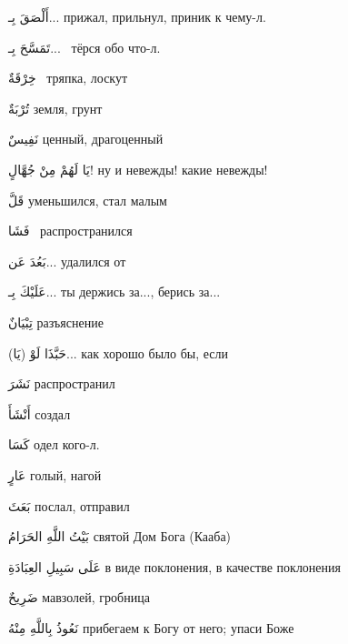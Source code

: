 \documentclass[a5paper]{article}
\newcommand\textstyleDropCaps[1]{#1}
\newcommand\textstyleCaptioncharacters[1]{#1}
\begin{document}
\textstyleCaptioncharacters{أَلْصَقَ بِـ... }\textstyleDropCaps{прижал, при­льнул, приник к чему-л.‎}

\textstyleCaptioncharacters{تَمَسَّحَ بِـ... \ }\textstyleDropCaps{тёрся обо что-л.‎}

\textstyleCaptioncharacters{خِرْقَةٌ \ }\textstyleDropCaps{тряпка, лоскут‎}

\textstyleCaptioncharacters{تُرْبَةٌ }\textstyleDropCaps{земля, грунт ‎}

\textstyleCaptioncharacters{نَفِيسٌ }\textstyleDropCaps{ценный, драгоцен­ный‎}

\textstyleCaptioncharacters{يَا لَهُمْ مِنْ جُهَّالٍ! }\textstyleDropCaps{ну и невежды! какие невежды! ‎}

\textstyleCaptioncharacters{قَلَّ }\textstyleDropCaps{уменьшился, стал ма­лым‎}

\textstyleCaptioncharacters{فَشَا \ }\textstyleDropCaps{распространился‎}

\textstyleCaptioncharacters{بَعُدَ عَن... }\textstyleDropCaps{удалился от‎}

\textstyleCaptioncharacters{عَلَيْكَ بِـ... }\textstyleDropCaps{ты держись за..., берись за...‎}

\textstyleCaptioncharacters{تِبْيَانٌ }\textstyleDropCaps{разъяснение‎}

\textstyleCaptioncharacters{(يَا) حَبَّذَا لَوْ... }\textstyleDropCaps{как хо­рошо было бы, если ‎}

\textstyleCaptioncharacters{نَشَرَ }\textstyleDropCaps{распространил ‎}

\textstyleCaptioncharacters{أَنْشَأَ }\textstyleDropCaps{создал ‎}

\textstyleCaptioncharacters{كَسَا }\textstyleDropCaps{одел кого-л. ‎}

\textstyleCaptioncharacters{عَارٍ }\textstyleDropCaps{голый, нагой ‎}

\textstyleCaptioncharacters{بَعَثَ }\textstyleDropCaps{послал, отправил‎}

\textstyleCaptioncharacters{بَيْتُ اللَّهِ الحَرَامُ }\textstyleDropCaps{святой Дом Бога (Кааба) ‎}

\textstyleCaptioncharacters{عَلَى سَبِيلِ العِبَادَةِ }\textstyleDropCaps{в виде поклонения, в качестве поклонения ‎}

\textstyleCaptioncharacters{ضَرِيحٌ }\textstyleDropCaps{мавзолей, гробни­ца‎}

\textstyleCaptioncharacters{نَعُوذُ بِاللَّهِ مِنْهُ }\textstyleDropCaps{прибе­гаем к Богу от него; упаси Боже‎}
\end{document}
